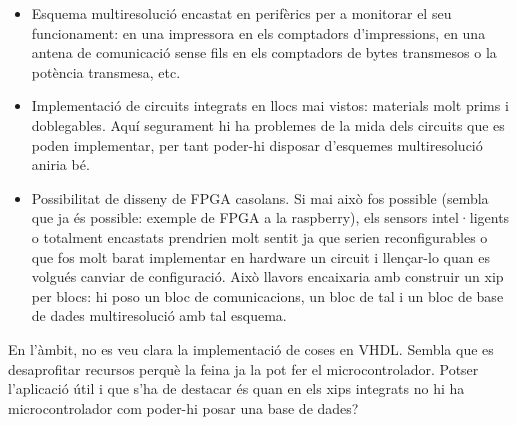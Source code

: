 \begin{itemize}
\begin{itemize}
  \item Esquema multiresolució encastat en perifèrics per a monitorar
    el seu funcionament: en una impressora en els comptadors
    d'impressions, en una antena de comunicació sense fils en els
    comptadors de bytes transmesos o la potència transmesa, etc.

  \item Implementació de circuits integrats en llocs mai vistos:
    materials molt prims i doblegables. Aquí segurament hi ha
    problemes de la mida dels circuits que es poden implementar, per
    tant poder-hi disposar d'esquemes multiresolució aniria bé.

  \item Possibilitat de disseny de FPGA casolans. Si mai això fos
    possible (sembla que ja és possible: exemple de FPGA a la
    raspberry), els sensors intel·ligents o totalment encastats
    prendrien molt sentit ja que serien reconfigurables o que fos molt
    barat implementar en hardware un circuit i llençar-lo quan es
    volgués canviar de configuració. Això llavors encaixaria amb
    construir un xip per blocs: hi poso un bloc de comunicacions, un
    bloc de tal i un bloc de base de dades multiresolució amb tal
    esquema.

  \end{itemize}


\end{itemize}

En l'àmbit, no es veu clara la implementació de coses en VHDL. Sembla que es desaprofitar recursos perquè la feina ja la pot fer el microcontrolador. Potser l'aplicació útil i que s'ha de destacar és quan en els xips integrats no hi ha microcontrolador com poder-hi posar una base de dades?





